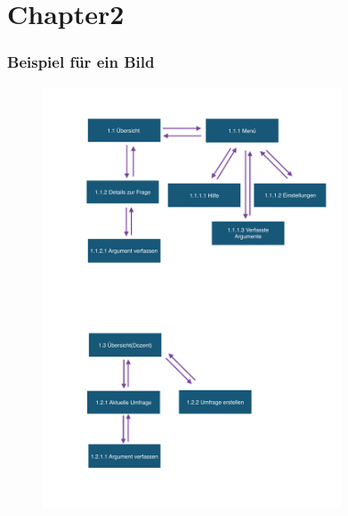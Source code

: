 \chapter{Chapter2}
\label{chap:chap2}

\subsection{Beispiel für ein Bild}
\label{sec:objekthierarchie}

\begin{figure}
  \vspace{-20pt}
  \begin{center}
    \includegraphics[page=1,width=0.79\textwidth]{./images/image}
  \end{center}
  \vspace{-40pt}
\end{figure}